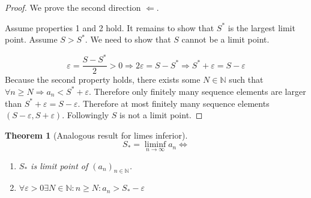 \documentclass[a4paper,landscape,twocolumn]{article}
\newtheorem{theorem}{Theorem}
\newcommand\seq[1]{{\left(#1\right)}_{n \in \mathbb N}}
\begin{document}
\begin{proof}
  We prove the second direction $\Leftarrow$.

  Assume properties 1 and 2 hold. It remains to show that $S^*$ is the largest limit point.
  Assume $S > S^*$. We need to show that $S$ cannot be a limit point.

  \[
    \varepsilon = \frac{S - S^*}{2} > 0
    \Rightarrow 2\varepsilon = S - S^*
    \Rightarrow S^* + \varepsilon = S - \varepsilon
  \]
  Because the second property holds, there exists some $N \in \mathbb N$ such that
  $\forall n \geq N \Rightarrow a_n < S^* + \varepsilon$. Therefore only finitely many
  sequence elements are larger than $S^* + \varepsilon = S - \varepsilon$.
  Therefore at most finitely many sequence elements $(S - \varepsilon, S + \varepsilon)$.
  Followingly $S$ is not a limit point.
\end{proof}

\begin{theorem}[Analogous result for limes inferior]
  \[ S_* = \liminf_{n\to\infty} a_n \Leftrightarrow \]
  \begin{enumerate}
    \item $S_*$ is limit point of $\seq{a_n}$.
    \item $\forall \varepsilon > 0 \exists N \in \mathbb N: n \geq N: a_n > S_* - \varepsilon$
  \end{enumerate}
\end{theorem}
\end{document}
